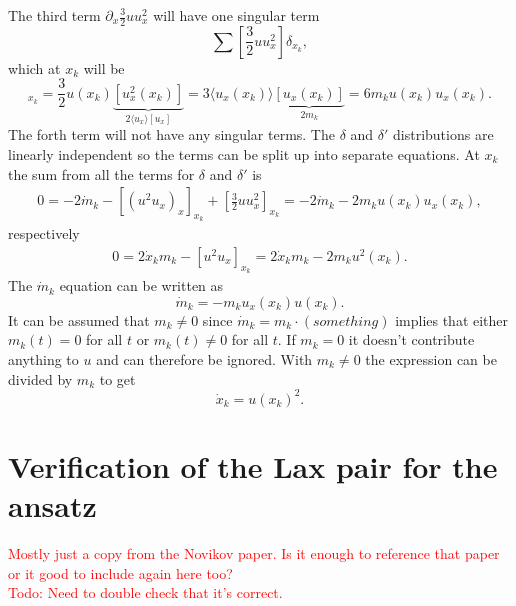\documentclass[english,master]{liumaiex}
\theoremstyle{plain}
\theoremstyle{definition}
\newcommand\todo[1]{\textcolor{red}{#1}}
\begin{document}
The third term $\partial_x \frac{3}{2}u u_x^2$ will have one singular term
\begin{equation}
	\sum [\frac{3}{2} u u_x^2] \delta_{x_k},
\end{equation}
which at $x_k$ will be
\begin{equation}
	[\frac{3}{2}u u_x^2]_{x_k} = \frac{3}{2}u(x_k) \underbrace{[u_x^2(x_k)]}_{2\langle u_x \rangle [u_x]} = 3 \langle u_x(x_k) \rangle \underbrace{[u_x(x_k)]}_{2m_k} = 6m_k u(x_k) u_x(x_k).
\end{equation}
%
The forth term will not have any singular terms. The $\delta$ and $\delta'$ distributions are linearly independent so the terms can be split up into separate equations. At $x_k$ the sum from all the terms for $\delta$ and $\delta'$ is
\begin{equation}
\begin{aligned}
	0 = -2 \dot{m}_k - [(u^2u_x)_x]_{x_k} + [\frac{3}{2}uu_x^2]_{x_k} = -2 \dot{m}_k - 2 m_k u(x_k) u_x(x_k),
\end{aligned}
\end{equation}
respectively
\begin{equation}
\begin{aligned}
	0 = 2 \dot{x}_k m_k - [u^2u_x]_{x_k} = 2 \dot{x}_k m_k - 2m_ku^2(x_k).
\end{aligned}
\end{equation}
%
The $\dot{m}_k$ equation can be written as
\begin{equation}
	\dot{m}_k = -m_ku_x(x_k)u(x_k).
\end{equation}
It can be assumed that $m_k \neq 0$ since $\dot{m}_k = m_k \cdot (something)$ implies that either $m_k(t) = 0$ for all $t$ or $m_k(t) \neq 0$ for all $t$. If $m_k = 0$ it doesn't contribute anything to $u$ and can therefore be ignored. With $m_k \neq 0$ the expression can be divided by $m_k$ to get
\begin{equation}
	\dot{x}_k = u(x_k)^2.
\end{equation}

\section{Verification of the Lax pair for the ansatz}

\todo{Mostly just a copy from the Novikov paper. Is it enough to reference that paper or it good to include again here too?} \\
\todo{Todo: Need to double check that it's correct.}
\end{document}
